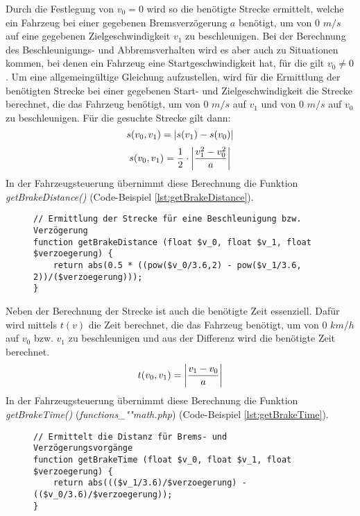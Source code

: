 Durch die Festlegung von $v_{0} = 0$ wird so die benötigte Strecke ermittelt, welche ein Fahrzeug bei einer gegebenen Bremsverzögerung $a$ benötigt, um von 0 $m/s$ auf eine gegebenen Zielgeschwindigkeit $v_{1}$ zu beschleunigen. Bei der Berechnung des Be\-schleu\-ni\-gungs- und Abbremsverhalten wird es aber auch zu Situationen kommen, bei denen ein Fahrzeug eine Startgeschwindigkeit hat, für die gilt $v_{0} \neq 0$. Um eine allgemeingültige Gleichung aufzustellen, wird für die Ermittlung der benötigten Strecke bei einer gegebenen Start- und Zielgeschwindigkeit die Strecke berechnet, die das Fahrzeug benötigt, um von 0 $m/s$ auf $v_{1}$ und von 0 $m/s$ auf $v_{0}$ zu beschleunigen. Für die gesuchte Strecke gilt dann: 
\begin{equation}
s(v_{0}, v_{1}) = \left\vert s(v_{1}) - s(v_{0})\right\vert 
\end{equation}
\begin{equation}
\label{eq:s_v_ges}
s(v_{0}, v_{1}) =\frac{1}{2} \cdot\left\vert\frac{v_{1}^{2} - v_{0}^{2}}{a}\right\vert
\end{equation}
In der Fahrzeugsteuerung übernimmt diese Berechnung die Funktion \textit{get\-Brake\-Dis\-tance()} (Code-Beispiel \ref{lst:getBrakeDistance}). 
\begin{figure}[H]
\begin{lstlisting}[caption={\textit{getBrakeDistance$($$)$} (\textit{functions\_math.php})},captionpos=b,label={lst:getBrakeDistance}]
// Ermittlung der Strecke für eine Beschleunigung bzw. Verzögerung
function getBrakeDistance (float $v_0, float $v_1, float $verzoegerung) {
	return abs(0.5 * ((pow($v_0/3.6,2) - pow($v_1/3.6, 2))/($verzoegerung)));
}
\end{lstlisting}
\end{figure}
\noindent Neben der Berechnung der Strecke ist auch die benötigte Zeit essenziell. Dafür wird mittels $t(v)$ die Zeit berechnet, die das Fahrzeug benötigt, um von 0 $km/h$ auf $v_{0}$ bzw. $v_{1}$ zu beschleunigen und aus der Differenz wird die benötigte Zeit berechnet.
\begin{equation}
\label{eq:t_v_ges}
t(v_{0}, v_{1}) = \left\vert\frac{v_{1} - v_{0}}{a}\right\vert
\end{equation}
\newpage
\noindent In der Fahrzeugsteuerung übernimmt diese Berechnung die Funktion \textit{getBrakeTime()} (\textit{func\-tions\_""math\-.php}) (Code-Beispiel \ref{lst:getBrakeTime}).
\begin{figure}[H]
\begin{lstlisting}[caption={\textit{getBrakeTime$($$)$} (\textit{functions\_math.php})},captionpos=b,label={lst:getBrakeTime}]
// Ermittelt die Distanz für Brems- und Verzögerungsvorgänge
function getBrakeTime (float $v_0, float $v_1, float $verzoegerung) {
	return abs((($v_1/3.6)/$verzoegerung) - (($v_0/3.6)/$verzoegerung));
}
\end{lstlisting}
\end{figure}
